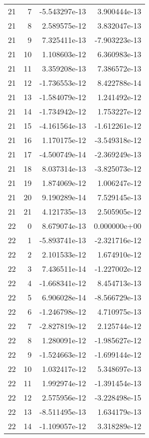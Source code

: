 \begin{tabular}{rrrr}
  21 &    7 & -5.543297e-13 &  3.900444e-13 \\
  21 &    8 &  2.589575e-12 &  3.832047e-13 \\
  21 &    9 &  7.325411e-13 & -7.903223e-13 \\
  21 &   10 &  1.108603e-12 &  6.360983e-13 \\
  21 &   11 &  3.359208e-13 &  7.386572e-13 \\
  21 &   12 & -1.736553e-12 &  8.422788e-14 \\
  21 &   13 & -1.584079e-12 &  1.241492e-12 \\
  21 &   14 & -1.734942e-12 &  1.753227e-12 \\
  21 &   15 & -4.161564e-13 & -1.612261e-12 \\
  21 &   16 &  1.170175e-12 & -3.549318e-12 \\
  21 &   17 & -4.500749e-14 & -2.369249e-13 \\
  21 &   18 &  8.037314e-13 & -3.825073e-12 \\
  21 &   19 &  1.874069e-12 &  1.006247e-12 \\
  21 &   20 &  9.190289e-14 &  7.529145e-13 \\
  21 &   21 &  4.121735e-13 &  2.505905e-12 \\
  22 &    0 &  8.679074e-13 &  0.000000e+00 \\
  22 &    1 & -5.893741e-13 & -2.321716e-12 \\
  22 &    2 &  2.101533e-12 &  1.674910e-12 \\
  22 &    3 &  7.436511e-14 & -1.227002e-12 \\
  22 &    4 & -1.668341e-12 &  8.454713e-13 \\
  22 &    5 &  6.906028e-14 & -8.566729e-13 \\
  22 &    6 & -1.246798e-12 &  4.710975e-13 \\
  22 &    7 & -2.827819e-12 &  2.125744e-12 \\
  22 &    8 &  1.280091e-12 & -1.985627e-12 \\
  22 &    9 & -1.524663e-12 & -1.699144e-12 \\
  22 &   10 &  1.032417e-12 &  5.348697e-13 \\
  22 &   11 &  1.992974e-12 & -1.391454e-13 \\
  22 &   12 &  2.575956e-12 & -3.228498e-15 \\
  22 &   13 & -8.511495e-13 &  1.634179e-13 \\
  22 &   14 & -1.109057e-12 &  3.318289e-12 \\

\end{tabular}
